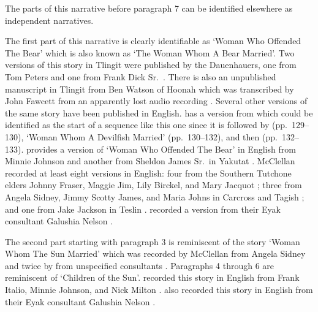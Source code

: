 The parts of this narrative before paragraph 7 can be identified elsewhere as independent narratives.

The first part of this narrative is clearly identifiable as  ‘Woman Who Offended The Bear’ which is also known as  ‘The Woman Whom A Bear Married’.
Two versions of this story in Tlingit were published by the Dauenhauers, one from  Tom Peters \parencite[166–193]{dauenhauer:1987} and one from  Frank Dick Sr.\ \parencite[194–217]{dauenhauer:1987}.
There is also an unpublished manuscript in Tlingit from  Ben Watson of Hoonah which was transcribed by  John Fawcett from an apparently lost audio recording \parencite{fawcett:1973a}.
Several other versions of the same story have been published in English.
\citeauthor{swanton:1909} has a version from  \parencite[126–129]{swanton:1909} which could be identified as the start of a sequence like this one since it is followed by  (pp.\ 129–130),  ‘Woman Whom A Devilfish Married’ (pp.\ 130–132), and then  (pp.\ 132–133).
\citeauthor{de-laguna:1972} provides a version of  ‘Woman Who Offended The Bear’ in English from  Minnie Johnson and another from  Sheldon James Sr.\ in Yakutat \parencite[880–883]{de-laguna:1972}.
McClellan recorded at least eight versions in English: four from the Southern Tutchone elders Johnny Fraser, Maggie Jim, Lily Birckel, and Mary Jacquot \parencite[39–41, 143–146, 163–167, 181–186]{mcclellan-cruikshank:2007a}; three from  Angela Sidney,  Jimmy Scotty James, and  Maria Johns in Carcross and Tagish \parencite[302–308, 435–437, 465–474]{mcclellan-cruikshank:2007b}; and one from  Jake Jackson in Teslin \parencite[498–512]{mcclellan-cruikshank:2007c}.
\citeauthor{birket-smith-de-laguna:1938} recorded a version from their Eyak consultant Galushia Nelson \parencite[277–279]{birket-smith-de-laguna:1938}.

The second part starting with paragraph 3 is reminiscent of the story  ‘Woman Whom The Sun Married’ which was recorded by McClellan from  Angela Sidney \parencite[288–289]{mcclellan-cruikshank:2007a} and twice by \citeauthor{olson:1967} from unspecified consultants \parencite[44, 67 col.\ 2 ¶3]{olson:1967}.
Paragraphs 4 through 6 are reminiscent of  ‘Children of the Sun’.
\citeauthor{de-laguna:1972} recorded this story in English from  Frank Italio,  Minnie Johnson, and  Nick Milton \parencite[873–875]{de-laguna:1972}.
\citeauthor{birket-smith-de-laguna:1938} also recorded this story in English from their Eyak consultant Galushia Nelson \parencite[294–300]{birket-smith-de-laguna:1938}.

